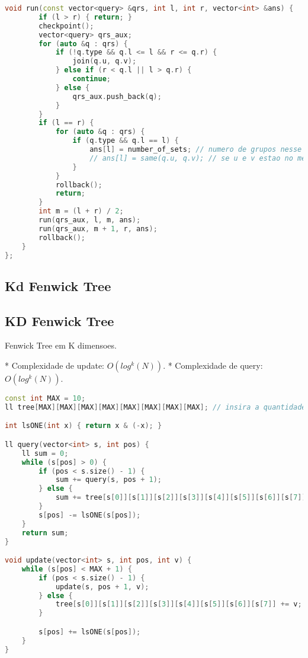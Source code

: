\documentclass[11pt, a4paper, twoside]{article}
\begin{document}
\begin{lstlisting}[language=C++]
    void run(const vector<query> &qrs, int l, int r, vector<int> &ans) {
        if (l > r) { return; }
        checkpoint();
        vector<query> qrs_aux;
        for (auto &q : qrs) {
            if (!q.type && q.l <= l && r <= q.r) {
                join(q.u, q.v);
            } else if (r < q.l || l > q.r) {
                continue;
            } else {
                qrs_aux.push_back(q);
            }
        }
        if (l == r) {
            for (auto &q : qrs) {
                if (q.type && q.l == l) {
                    ans[l] = number_of_sets; // numero de grupos nesse tempo
                    // ans[l] = same(q.u, q.v); // se u e v estao no mesmo grupo
                }
            }
            rollback();
            return;
        }
        int m = (l + r) / 2;
        run(qrs_aux, l, m, ans);
        run(qrs_aux, m + 1, r, ans);
        rollback();
    }
};\end{lstlisting}

\subsection{Kd Fenwick Tree}


\subsection{KD Fenwick Tree}



Fenwick Tree em K dimensoes.

* Complexidade de update: $O(log^k(N))$.
* Complexidade de query: $O(log^k(N))$.
\begin{lstlisting}[language=C++]
const int MAX = 10;
ll tree[MAX][MAX][MAX][MAX][MAX][MAX][MAX][MAX]; // insira a quantidade necessaria de dimensoes

int lsONE(int x) { return x & (-x); }

ll query(vector<int> s, int pos) {
    ll sum = 0;
    while (s[pos] > 0) {
        if (pos < s.size() - 1) {
            sum += query(s, pos + 1);
        } else {
            sum += tree[s[0]][s[1]][s[2]][s[3]][s[4]][s[5]][s[6]][s[7]];
        }
        s[pos] -= lsONE(s[pos]);
    }
    return sum;
}

void update(vector<int> s, int pos, int v) {
    while (s[pos] < MAX + 1) {
        if (pos < s.size() - 1) {
            update(s, pos + 1, v);
        } else {
            tree[s[0]][s[1]][s[2]][s[3]][s[4]][s[5]][s[6]][s[7]] += v;
        }

        s[pos] += lsONE(s[pos]);
    }
}\end{lstlisting}
\end{document}
